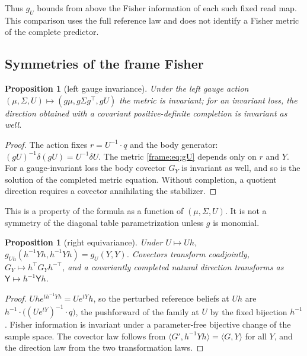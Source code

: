 \documentclass[11pt]{article}
\newtheorem{proposition}[theorem]{Proposition}
\theoremstyle{definition}
\theoremstyle{remark}
\providecommand{\ip}[2]{\langle #1, #2\rangle}
\begin{document}
Thus $g_U$ bounds from above the Fisher information of each such fixed read map. This comparison uses the full reference law and does not identify a Fisher metric of the complete predictor.

\subsection{Symmetries of the frame Fisher}\label{frame:sec:symmetries}

\begin{proposition}[left gauge invariance]\label{frame:prop:left}
Under the left gauge action $(\mu,\Sigma,U)\mapsto(g\mu,g\Sigma g^\top,gU)$ the metric is invariant; for an invariant loss, the direction obtained with a covariant positive-definite completion is invariant as well.
\end{proposition}
\begin{proof}
The action fixes $r=U^{-1}\cdot q$ and the body generator: $(gU)^{-1}\delta(gU)=U^{-1}\delta U$. The metric \eqref{frame:eq:gU} depends only on $r$ and $Y$. For a gauge-invariant loss the body covector $G_Y$ is invariant as well, and so is the solution of the completed metric equation. Without completion, a quotient direction requires a covector annihilating the stabilizer.
\end{proof}

This is a property of the formula as a function of $(\mu,\Sigma,U)$. It is not a symmetry of the diagonal table parametrization unless $g$ is monomial.

\begin{proposition}[right equivariance]\label{frame:prop:right}
Under $U\mapsto Uh$, $g_{Uh}(h^{-1}Yh,h^{-1}Yh)=g_U(Y,Y)$. Covectors transform coadjointly, $G_Y\mapsto h^\top G_Yh^{-\top}$, and a covariantly completed natural direction transforms as $\mathsf{Y}\mapsto h^{-1}\mathsf{Y} h$.
\end{proposition}
\begin{proof}
$Uhe^{t h^{-1}Yh}=Ue^{tY}h$, so the perturbed reference beliefs at $Uh$ are $h^{-1}\cdot\big((Ue^{tY})^{-1}\cdot q\big)$, the pushforward of the family at $U$ by the fixed bijection $h^{-1}$. Fisher information is invariant under a parameter-free bijective change of the sample space. The covector law follows from $\ip{G'}{h^{-1}Yh}=\ip{G}{Y}$ for all $Y$, and the direction law from the two transformation laws.
\end{proof}
\end{document}
